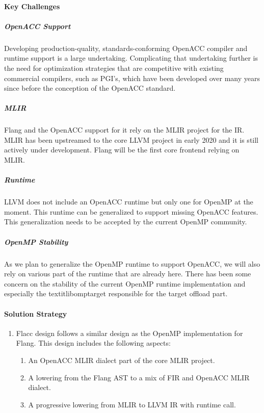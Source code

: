 \paragraph{Key Challenges}

\subparagraph{OpenACC Support} Developing production-quality,
      standards-conforming OpenACC compiler and runtime support is a large
      undertaking. Complicating that undertaking further is the need for
      optimization strategies that are competitive with existing commercial
      compilers, such as PGI's, which have been developed over many years
      since before the conception of the OpenACC standard.

\subparagraph{MLIR} Flang and the OpenACC support for it rely on the MLIR
      project for the IR. MLIR has been upstreamed to
      the core LLVM project in early 2020 and it is still actively under
      development. Flang will be the first core frontend relying on MLIR.

\subparagraph{Runtime} LLVM does not include an OpenACC runtime but only one
      for OpenMP at the moment. This runtime can be generalized to support
      missing OpenACC features. This generalization needs to be accepted by the
      current OpenMP community.

\subparagraph{OpenMP Stability} As we plan to generalize the OpenMP runtime to
      support OpenACC, we will also rely on various part of the runtime that
      are already here. There has been some concern on the stability of the
      current OpenMP runtime implementation and especially the
      textit{libomptarget} responsible for the target offload part.


\paragraph{Solution Strategy}

\begin{enumerate}

\item Flacc design follows a similar design as the OpenMP implementation for
      Flang. This design includes the following aspects:

\begin{enumerate}
\item An OpenACC MLIR dialect part of the core MLIR project.
\item A lowering from the Flang AST to a mix of FIR and OpenACC MLIR dialect.
\item A progressive lowering from MLIR to LLVM IR with runtime call.
\end{enumerate}

\end{enumerate}

